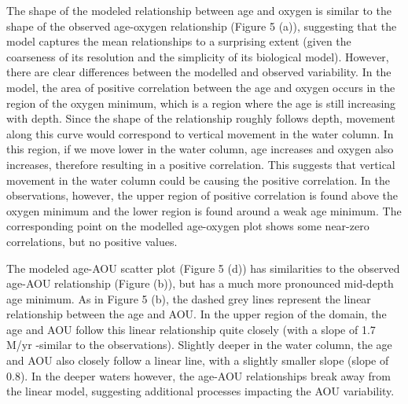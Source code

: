 The shape of the modeled relationship between age and oxygen is similar to the shape of the observed age-oxygen relationship (Figure 5 (a)), suggesting that the model captures the mean relationships to a surprising extent (given the coarseness of its resolution and the simplicity of its biological model). However, there are clear differences between the modelled and observed variability.  In the model, the area of positive correlation between the age and oxygen occurs in the region of the oxygen minimum, which is a region where the age is still increasing with depth. Since the shape of the relationship roughly follows depth, movement along this curve would correspond to vertical movement in the water column. In this region, if we move lower in the water column, age increases and oxygen also increases, therefore resulting in a positive correlation. This suggests that vertical movement in the water column could be causing the positive correlation. In the observations, however, the upper region of positive correlation is found above the oxygen minimum and the lower region is found around a weak age minimum. The corresponding point on the modelled age-oxygen plot shows some near-zero correlations, but no positive values.

The modeled age-AOU scatter plot (Figure 5 (d)) has similarities to the observed age-AOU relationship (Figure  (b)), but has a much more pronounced mid-depth age minimum. As in Figure 5 (b), the dashed grey lines represent the linear relationship between the age and AOU. In the upper region of the domain, the age and AOU follow this linear relationship quite closely (with a slope of 1.7  M/yr -similar to the observations). Slightly deeper in the water column, the age and AOU also closely follow a linear line, with a slightly smaller slope (slope of 0.8). In the deeper waters however, the age-AOU relationships break away from the linear model, suggesting additional processes impacting the AOU variability.

